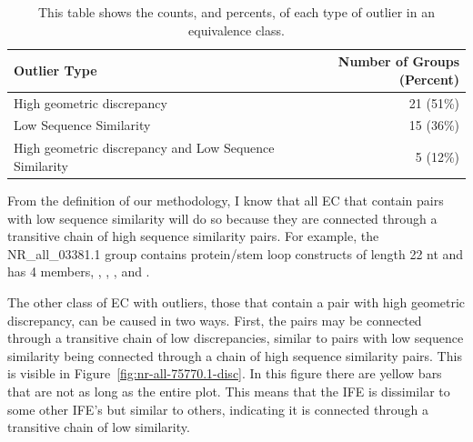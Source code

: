 \begin{table}
  \begin{tabular}{lr}
    \toprule
    Outlier Type & Number of Groups (Percent) \\
    \midrule
    High geometric discrepancy & 21 (51\%) \\
    Low Sequence Similarity & 15 (36\%) \\
    High geometric discrepancy and Low Sequence Similarity & 5 (12\%) \\
    \bottomrule
  \end{tabular}
  \caption{This table shows the counts, and percents, of each type of outlier
  in an equivalence class.}
  \label{tab:outlier-types}
\end{table}

From the definition of our methodology, I know that all EC that contain pairs
with low sequence similarity will do so because they are connected through a
transitive chain of high sequence similarity pairs. For example, the
NR\_all\_03381.1 group contains protein/stem loop constructs of length 22 nt and
has 4 members, , , , and
.

The other class of EC with outliers, those that contain a pair with high
geometric discrepancy, can be caused in two ways. First, the pairs may be
connected through a transitive chain of low discrepancies, similar to pairs with
low sequence similarity being connected through a chain of high sequence
similarity pairs. This is visible in Figure~\ref{fig:nr-all-75770.1-disc}. In
this figure there are yellow bars that are not as long as the entire plot. This
means that the IFE is dissimilar to some other IFE's but similar to others,
indicating it is connected through a transitive chain of low similarity.

